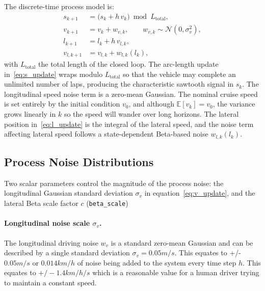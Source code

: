 The discrete-time process model is:
\begin{align}
    s_{k+1}    &= \bigl( s_k + h\,v_k \bigr) \bmod L_{\text{total}}, \label{eq:s_update} \\
    v_{k+1}    &= v_k + w_{v,k}, \qquad w_{v,k} \sim \mathcal{N}\!\left(0,\sigma_v^{2}\right), \label{eq:v_update} \\
    l_{k+1}    &= l_k + h\,v_{l,k}, \label{eq:l_update} \\
    v_{l,k+1}  &= v_{l,k} + w_{l,k}(l_k), \label{eq:vl_update}
\end{align}
with $L_{\text{total}}$ the total length of the closed loop. The arc-length update in~\eqref{eq:s_update} wraps modulo $L_{\text{total}}$ so that the vehicle may complete an unlimited number of laps, producing the characteristic sawtooth signal in $s_k$. The longitudinal speed noise term is a zero-mean Gaussian. The nominal cruise speed is set entirely by the initial condition $v_0$, and although $\mathbb{E}[v_k]=v_0$, the variance grows linearly in $k$ so the speed will wander over long horizons. The lateral position in~\eqref{eq:l_update} is the integral of the lateral speed, and the noise term affecting lateral speed follows a state-dependent Beta-based noise $w_{l,k}(l_k)$.

\subsection{Process Noise Distributions}
\label{subsec:noise}

Two scalar parameters control the magnitude of the process noise: the longitudinal Gaussian standard deviation $\sigma_v$ in equation~\eqref{eq:v_update}, and the lateral Beta scale factor $c$ (\texttt{beta\_scale})

\paragraph{Longitudinal noise scale $\sigma_v$.}
The longitudinal driving noise $w_v$ is a standard zero-mean Gaussian and can be described by a single standard deviation $\sigma_v = 0.05m/s$. This equates to +/- $0.05m/s$ or $0.014km/h$ of noise being added to the system every time step $h$. This equates to $+/- 1.4km/h/s$ which is a reasonable value for a human driver trying to maintain a constant speed. 

